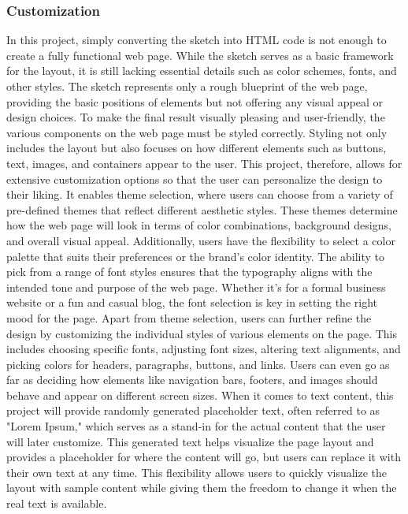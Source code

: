     \subsubsection{Customization}  
    In this project, simply converting the sketch into HTML code is not enough to create a fully functional web page. While the sketch serves as a basic framework for the layout, it is still lacking essential details such as color schemes, fonts, and other styles. The sketch represents only a rough blueprint of the web page, providing the basic positions of elements but not offering any visual appeal or design choices. To make the final result visually pleasing and user-friendly, the various components on the web page must be styled correctly. Styling not only includes the layout but also focuses on how different elements such as buttons, text, images, and containers appear to the user. 
    This project, therefore, allows for extensive customization options so that the user can personalize the design to their liking. It enables theme selection, where users can choose from a variety of pre-defined themes that reflect different aesthetic styles. These themes determine how the web page will look in terms of color combinations, background designs, and overall visual appeal. Additionally, users have the flexibility to select a color palette that suits their preferences or the brand's color identity. The ability to pick from a range of font styles ensures that the typography aligns with the intended tone and purpose of the web page. Whether it’s for a formal business website or a fun and casual blog, the font selection is key in setting the right mood for the page.
    Apart from theme selection, users can further refine the design by customizing the individual styles of various elements on the page. This includes choosing specific fonts, adjusting font sizes, altering text alignments, and picking colors for headers, paragraphs, buttons, and links. Users can even go as far as deciding how elements like navigation bars, footers, and images should behave and appear on different screen sizes.
    When it comes to text content, this project will provide randomly generated placeholder text, often referred to as "Lorem Ipsum," which serves as a stand-in for the actual content that the user will later customize. This generated text helps visualize the page layout and provides a placeholder for where the content will go, but users can replace it with their own text at any time. This flexibility allows users to quickly visualize the layout with sample content while giving them the freedom to change it when the real text is available.
